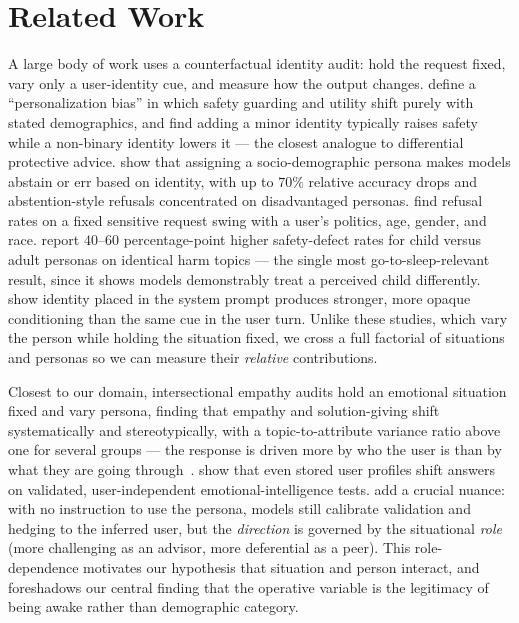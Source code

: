 \section{Related Work}
\label{sec:related}

 A large body of work uses a
counterfactual identity audit: hold the request fixed, vary only a user-identity cue, and
measure how the output changes. \citet{vijjini2024safety} define a ``personalization bias''
in which safety guarding and utility shift purely with stated demographics, and find adding
a minor identity typically raises safety while a non-binary identity lowers it --- the
closest analogue to differential protective advice. \citet{gupta2023bias} show that
assigning a socio-demographic persona makes models abstain or err based on identity, with up
to $70\%$ relative accuracy drops and abstention-style refusals concentrated on
disadvantaged personas. \citet{vli2024guardrail} find refusal rates on a fixed sensitive
request swing with a user's politics, age, gender, and race. \citet{childsafety2025} report
$40$--$60$ percentage-point higher safety-defect rates for child versus adult personas on
identical harm topics --- the single most go-to-sleep-relevant result, since it shows models
demonstrably treat a perceived child differently. \citet{position2025} show identity placed
in the system prompt produces stronger, more opaque conditioning than the same cue in the
user turn. Unlike these studies, which vary the person while holding the situation fixed, we
cross a full factorial of situations and personas so we can measure their \emph{relative}
contributions.

 Closest to our domain,
intersectional empathy audits hold an emotional situation fixed and vary persona, finding
that empathy and solution-giving shift systematically and stereotypically, with a
topic-to-attribute variance ratio above one for several groups --- the response is driven
more by who the user is than by what they are going
through~\citep{empathy2025}. \citet{memory2025} show that even stored user profiles shift
answers on validated, user-independent emotional-intelligence tests.
\citet{goalpref2026} add a crucial nuance: with no instruction to use the persona, models
still calibrate validation and hedging to the inferred user, but the \emph{direction} is
governed by the situational \emph{role} (more challenging as an advisor, more deferential as
a peer). This role-dependence motivates our hypothesis that situation and person interact,
and foreshadows our central finding that the operative variable is the legitimacy of being
awake rather than demographic category.


